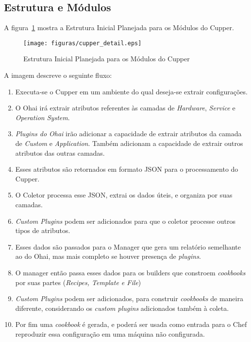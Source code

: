 \subsection{Estrutura e Módulos}

A figura~\ref{fig:cupper-detail} mostra a Estrutura Inicial Planejada para os 
Módulos do Cupper.

\begin{figure}[H]
  \centering
  \caption{Estrutura Inicial Planejada para os Módulos do Cupper}
  \label{fig:cupper-detail}
  \texttt{[image: figuras/cupper\_detail.eps]}
\end{figure}

A imagem descreve o seguinte fluxo:

\begin{enumerate}
    \item Executa-se o Cupper em um ambiente do qual deseja-se extrair configurações.
    \item O Ohai irá extrair atributos referentes às camadas de \textit{Hardware},
\textit{Service} e \textit{Operation System}.
    \item \textit{Plugins do Ohai} irão adicionar a capacidade de extrair atributos da
camada de \textit{Custom} e \textit{Application}. Também adicionam a capacidade
de extrair outros atributos das outras camadas.
    \item Esses atributos são retornados em formato JSON para o processamento
do Cupper.
    \item O Coletor processa esse JSON, extrai os dados úteis, e organiza
por suas camadas.
    \item \textit{Custom Plugins} podem ser adicionados para que o coletor
processe outros tipos de atributos.
    \item Esses dados são passados para o Manager que gera um relatório semelhante
ao do Ohai, mas mais completo se houver presença de \textit{plugins}.
    \item O manager então passa esses dados para os builders que constroem
\textit{cookbooks} por suas partes (\textit{Recipes, Template e File})
    \item \textit{Custom Plugins} podem ser adicionados, para construir
\textit{cookbooks} de maneira diferente, considerando os \textit{custom plugins}
adicionados também à coleta.
    \item Por fim uma \textit{cookbook} é gerada, e poderá ser usada como 
entrada para o Chef reproduzir essa configuração em uma máquina não
configurada.
\end{enumerate}
